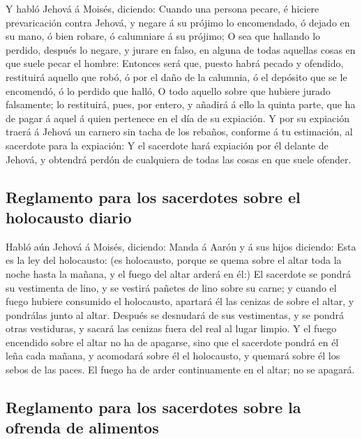  Y habló Jehová á Moisés, diciendo:  Cuando
una persona pecare, é hiciere prevaricación contra Jehová, y negare á su
prójimo lo encomendado, ó dejado en su mano, ó bien robare, ó calumniare
á su prójimo;  O sea que hallando lo perdido, después lo
negare, y jurare en falso, en alguna de todas aquellas cosas en que
suele pecar el hombre:  Entonces será que, puesto habrá
pecado y ofendido, restituirá aquello que robó, ó por el daño de la
calumnia, ó el depósito que se le encomendó, ó lo perdido que halló,
 O todo aquello sobre que hubiere jurado falsamente; lo
restituirá, pues, por entero, y añadirá á ello la quinta parte, que ha
de pagar á aquel á quien pertenece en el día de su expiación.
 Y por su expiación traerá á Jehová un carnero sin tacha
de los rebaños, conforme á tu estimación, al sacerdote para la
expiación:  Y el sacerdote hará expiación por él delante
de Jehová, y obtendrá perdón de cualquiera de todas las cosas en que
suele ofender.

\hypertarget{reglamento-para-los-sacerdotes-sobre-el-holocausto-diario}{%
\subsection{Reglamento para los sacerdotes sobre el holocausto
diario}\label{reglamento-para-los-sacerdotes-sobre-el-holocausto-diario}}

 Habló aún Jehová á Moisés, diciendo:  Manda
á Aarón y á sus hijos diciendo: Esta es la ley del holocausto: (es
holocausto, porque se quema sobre el altar toda la noche hasta la
mañana, y el fuego del altar arderá en él:)  El sacerdote
se pondrá su vestimenta de lino, y se vestirá pañetes de lino sobre su
carne; y cuando el fuego hubiere consumido el holocausto, apartará él
las cenizas de sobre el altar, y pondrálas junto al altar.
 Después se desnudará de sus vestimentas, y se pondrá
otras vestiduras, y sacará las cenizas fuera del real al lugar limpio.
 Y el fuego encendido sobre el altar no ha de apagarse,
sino que el sacerdote pondrá en él leña cada mañana, y acomodará sobre
él el holocausto, y quemará sobre él los sebos de las paces.
 El fuego ha de arder continuamente en el altar; no se
apagará.

\hypertarget{reglamento-para-los-sacerdotes-sobre-la-ofrenda-de-alimentos}{%
\subsection{Reglamento para los sacerdotes sobre la ofrenda de
alimentos}\label{reglamento-para-los-sacerdotes-sobre-la-ofrenda-de-alimentos}}

